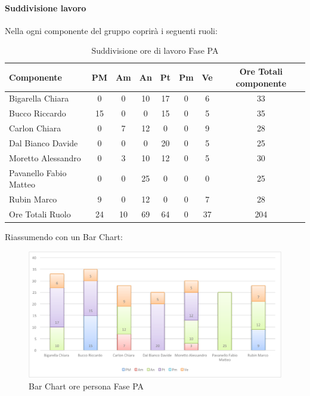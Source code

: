 			\paragraph{Suddivisione lavoro}
				Nella  ogni componente del gruppo \groupname{} coprirà i seguenti ruoli:
				\begin{table}[H]
					\begin{center}
						\begin{tabular}{| l | c | c | c | c | c | c | c |}
							\hline
							Componente 				& PM	& Am	 & An 	& Pt 		& Pm 	& Ve 	& Ore Totali componente \\ \hline
							
							Bigarella Chiara 			& 0		& 0		& 10 		& 17 		& 0		& 6 		& 33 \\
							Bucco Riccardo 			& 15 		& 0		& 0		& 15 		& 0		& 5 		& 35 \\
							Carlon Chiara	 			& 0		& 7 		& 12 		& 0		& 0		& 9 		& 28 \\
							Dal Bianco Davide 			& 0		& 0		& 0		& 20 		& 0		& 5		& 25 \\
							Moretto Alessandro 			& 0		& 3 		& 10 		& 12 		& 0		& 5 		& 30 \\
							Pavanello Fabio Matteo	 	& 0		& 0		& 25 		& 0		& 0		& 0		& 25 \\
							Rubin Marco				& 9 		& 0		& 12 		& 0		& 0		& 7 		& 28 \\ \hline \hline
							
							Ore Totali Ruolo 			& 24 		& 10 		& 69 		& 64 		& 0		& 37		& 204\\ \hline
						\end{tabular}
					\end{center}
					\caption{Suddivisione ore di lavoro Fase PA}
				\end{table}
				Riassumendo con un Bar Chart:
				\begin{figure}[H]\centering
					\includegraphics[width=\textwidth]{PianoDiProgetto/Pics/ChartOreFasePA.pdf}
					\caption{Bar Chart ore persona Fase PA}
				\end{figure}
